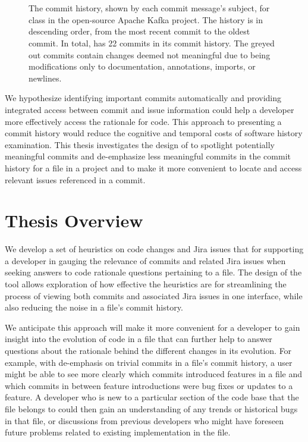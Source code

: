 \begin{figure}
\begin{mdframed}
\begin{RaggedRight}
		\textcolor{gray}{} \\
		 \\
	\end{RaggedRight}
	\end{mdframed}
	\caption{The commit history, shown by each commit message's subject, for  class in the open-source Apache Kafka project. 
		The history is in descending order, from the most recent commit to the oldest commit.
		In total,  has 22 commits in its commit history. The greyed out commits contain changes deemed not meaningful due to being modifications only to documentation, annotations, imports, or newlines.
	}
	\label{fig:Topology-Commit-History}
\end{figure}

We hypothesize identifying important commits automatically and providing integrated access between commit 
and issue information could help a developer more effectively access the rationale for code.
This approach to presenting a commit history would reduce the cognitive and temporal costs of software history examination. 
This thesis investigates the design of  to spotlight potentially meaningful commits and de-emphasize 
less meaningful commits in the commit history for a file in a project and to make it more convenient 
to locate and access relevant issues referenced in a commit. 


\section{Thesis Overview}

We develop a set of heuristics on code changes and Jira issues that for supporting a developer 
in gauging the relevance of commits and related Jira issues when seeking answers 
to code rationale questions pertaining to a file.
The design of the tool allows exploration of how effective the heuristics are 
for streamlining the process of viewing both commits and associated Jira issues in one interface, 
while also reducing the noise in a file's commit history.

We anticipate this approach will make it more convenient for a developer to gain insight into the evolution of code in a file that can further help to answer questions about the rationale behind the different changes in its evolution. 
For example, with de-emphasis on trivial commits in a file's commit history, a user might be able to see more clearly which commits introduced features in a file and which commits in between feature introductions were bug fixes or updates to a feature.
A developer who is new to a particular section of the code base that the file belongs to could then gain an understanding of any trends or historical bugs in that file, 
or discussions from previous developers who might have foreseen future problems related to existing implementation in the file.

